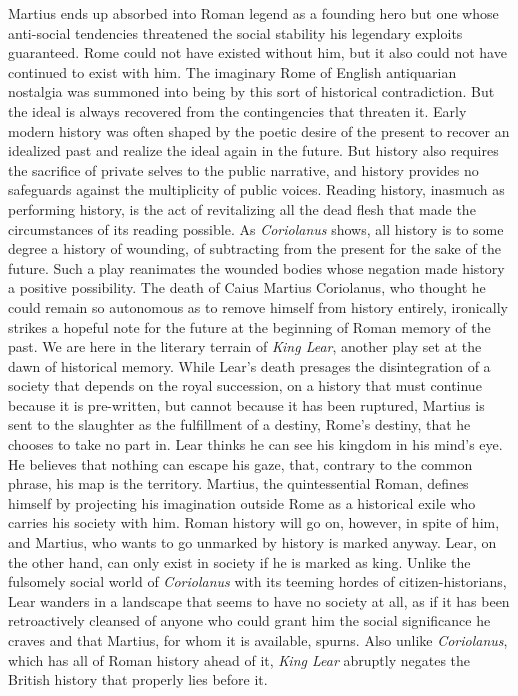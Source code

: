 Martius ends up absorbed into Roman legend as a founding hero but one whose anti-social tendencies threatened the social stability his legendary exploits guaranteed.
Rome could not have existed without him, but it also could not have continued to exist with him.
The imaginary Rome of English antiquarian nostalgia was summoned into being by this sort of historical contradiction.
But the ideal is always recovered from the contingencies that threaten it.
Early modern history was often shaped by the poetic desire of the present to recover an idealized past and realize the ideal again in the future.
But history also requires the sacrifice of private selves to the public narrative, and history provides no safeguards against the multiplicity of public voices.
Reading history, inasmuch as performing history, is the act of revitalizing all the dead flesh that made the circumstances of its reading possible.
As \emph{Coriolanus} shows, all history is to some degree a history of wounding, of subtracting from the present for the sake of the future.
Such a play reanimates the wounded bodies whose negation made history a positive possibility.
The death of Caius Martius Coriolanus, who thought he could remain so autonomous as to remove himself from history entirely, ironically strikes a hopeful note for the future at the beginning of Roman memory of the past.
We are here in the literary terrain of \emph{King Lear}, another play set at the dawn of historical memory.
While Lear's death presages the disintegration of a society that depends on the royal succession, on a history that must continue because it is pre-written, but cannot because it has been ruptured, Martius is sent to the slaughter as the fulfillment of a destiny, Rome's destiny, that he chooses to take no part in.
Lear thinks he can see his kingdom in his mind's eye.
He believes that nothing can escape his gaze, that, contrary to the common phrase, his map is the territory.
Martius, the quintessential Roman, defines himself by projecting his imagination outside Rome as a historical exile who carries his society with him.
Roman history will go on, however, in spite of him, and Martius, who wants to go unmarked by history is marked anyway.
Lear, on the other hand, can only exist in society if he is marked as king.
Unlike the fulsomely social world of \emph{Coriolanus} with its teeming hordes of citizen-historians, Lear wanders in a landscape that seems to have no society at all, as if it has been retroactively cleansed of anyone who could grant him the social significance he craves and that Martius, for whom it is available, spurns.
Also unlike \emph{Coriolanus}, which has all of Roman history ahead of it, \emph{King Lear} abruptly negates the British history that properly lies before it.

